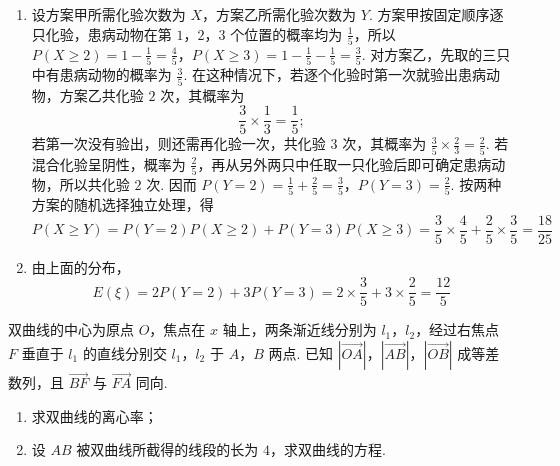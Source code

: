 \begin{solution}
\begin{enumerate}
\item 设方案甲所需化验次数为 \(X\)，方案乙所需化验次数为 \(Y\). 方案甲按固定顺序逐只化验，患病动物在第 \(1\)，\(2\)，\(3\) 个位置的概率均为 \(\frac{1}{5}\)，所以
\(P(X\geqslant2)=1-\frac{1}{5}=\frac{4}{5}\)，\(P(X\geqslant3)=1-\frac{1}{5}-\frac{1}{5}=\frac{3}{5}\).
对方案乙，先取的三只中有患病动物的概率为 \(\frac{3}{5}\). 在这种情况下，若逐个化验时第一次就验出患病动物，方案乙共化验 \(2\) 次，其概率为
\[
\frac{3}{5}\times\frac{1}{3}=\frac{1}{5};
\]
若第一次没有验出，则还需再化验一次，共化验 \(3\) 次，其概率为 \(\frac{3}{5}\times\frac{2}{3}=\frac{2}{5}\). 若混合化验呈阴性，概率为 \(\frac{2}{5}\)，再从另外两只中任取一只化验后即可确定患病动物，所以共化验 \(2\) 次. 因而
\(P(Y=2)=\frac{1}{5}+\frac{2}{5}=\frac{3}{5}\)，\(P(Y=3)=\frac{2}{5}\).
按两种方案的随机选择独立处理，得
\[
P(X\geqslant Y)=P(Y=2)P(X\geqslant2)+P(Y=3)P(X\geqslant3)
=\frac{3}{5}\times\frac{4}{5}+\frac{2}{5}\times\frac{3}{5}
=\frac{18}{25}
\]
\item 由上面的分布，
\[
E(\xi)=2P(Y=2)+3P(Y=3)
=2\times\frac{3}{5}+3\times\frac{2}{5}
=\frac{12}{5}
\]
\end{enumerate}
\end{solution}

\begin{problem}
双曲线的中心为原点 \(O\)，焦点在 \(x\) 轴上，两条渐近线分别为 \(l_{1}\)，\(l_{2}\)，经过右焦点 \(F\) 垂直于 \(l_{1}\) 的直线分别交 \(l_{1}\)，\(l_{2}\) 于 \(A\)，\(B\) 两点. 已知 \(\left|\overrightarrow{OA}\right|\)，\(\left|\overrightarrow{AB}\right|\)，\(\left|\overrightarrow{OB}\right|\) 成等差数列，且 \(\overrightarrow{BF}\) 与 \(\overrightarrow{FA}\) 同向.

\begin{enumerate}
\item 求双曲线的离心率；
\item 设 \(AB\) 被双曲线所截得的线段的长为 \(4\)，求双曲线的方程.
\end{enumerate}
\end{problem}

